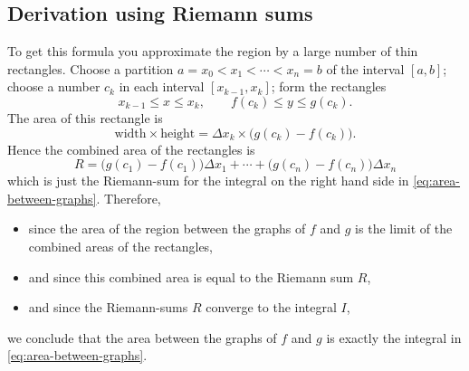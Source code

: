 \subsection{Derivation using Riemann sums}
To get this formula you approximate the region by a large number of thin
rectangles.  Choose a partition $a=x_0<x_1<\cdots<x_n=b$ of the interval
$[a,b]$; choose a number $c_k$ in each interval $[x_{k-1}, x_k]$; form the
rectangles
\[
x_{k-1} \leq x\leq x_k,\qquad f(c_k)\leq y\leq g(c_k).
\]
The area of this rectangle is
\[
\text{width}\times\text{height} = \Delta x_k\times\bigl(g(c_k) - f(c_k)\bigr).
\]
Hence the combined area of the rectangles is
\[
R= \bigl(g(c_1) - f(c_1)\bigr)\Delta x_1 + \cdots + \bigl(g(c_n) -
f(c_n)\bigr)\Delta x_n
\]
which is just the Riemann-sum for the integral on the right hand side in
\eqref{eq:area-between-graphs}.  Therefore,
\begin{itemize}

\item since the area of the region between the graphs of $f$ and $g$ is the
  limit of the combined areas of the rectangles,

\item and since this combined area is equal to the Riemann sum $R$,

\item and since the Riemann-sums $R$ converge to the integral $I$,

\end{itemize}
we conclude that the area between the graphs of $f$ and $g$ is exactly the
integral in \eqref{eq:area-between-graphs}.

